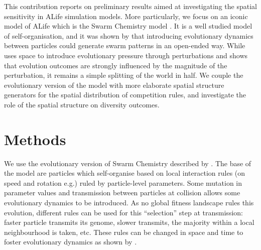 \documentclass[letterpaper]{article}
\begin{document}
This contribution reports on preliminary results aimed at investigating the spatial sensitivity in ALife simulation models. More particularly, we focus on an iconic model of ALife which is the Swarm Chemistry model \citep{sayama2009swarm}. It is a well studied model of self-organisation, and it was shown by \citep{sayama2018seeking} that introducing evolutionary dynamics between particles could generate swarm patterns in an open-ended way. While \citep{sayama2018seeking} uses space to introduce evolutionary pressure through perturbations and shows that evolution outcomes are strongly influenced by the magnitude of the perturbation, it remains a simple splitting of the world in half. We couple the evolutionary version of the model with more elaborate spatial structure generators for the spatial distribution of competition rules, and investigate the role of the spatial structure on diversity outcomes.

\section{Methods}

We use the evolutionary version of Swarm Chemistry described by \citep{sayama2018seeking}. The base of the model are particles which self-organise based on local interaction rules (on speed and rotation e.g.) ruled by particle-level parameters. Some mutation in parameter values and transmission between particles at collision allows some evolutionary dynamics to be introduced. As no global fitness landscape rules this evolution, different rules can be used for this ``selection'' step at transmission: faster particle transmits its genome, slower transmits, the majority within a local neighbourhood is taken, etc. These rules can be changed in space and time to foster evolutionary dynamics as shown by \citep{sayama2018seeking}.
\end{document}
